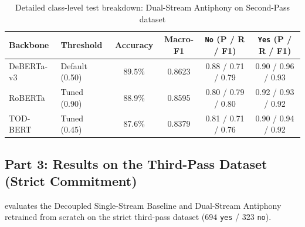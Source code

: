 \begin{table}[htbp]
  \centering
  \small
  \caption{Detailed class-level test breakdown: Dual-Stream Antiphony on Second-Pass dataset}
  \label{tab:breakdown-second-pass}
  \begin{tabularx}{\textwidth}{llcccc}
    \toprule
    \textbf{Backbone} & \textbf{Threshold} & \textbf{Accuracy} & \textbf{Macro-F1} & \textbf{\texttt{No} (P / R / F1)} & \textbf{\texttt{Yes} (P / R / F1)} \\
    \midrule
    DeBERTa-v3 & Default (0.50) & 89.5\% & 0.8623 & 0.88 / 0.71 / 0.79 & 0.90 / 0.96 / 0.93 \\
    \rowcolor{lightbg}
    RoBERTa & Tuned (0.90) & 88.9\% & 0.8595 & 0.80 / 0.79 / 0.80 & 0.92 / 0.93 / 0.92 \\
    TOD-BERT & Tuned (0.45) & 87.6\% & 0.8379 & 0.81 / 0.71 / 0.76 & 0.90 / 0.94 / 0.92 \\
    \bottomrule
  \end{tabularx}
\end{table}

\subsection{Part 3: Results on the Third-Pass Dataset (Strict Commitment)}
 evaluates the Decoupled Single-Stream Baseline and Dual-Stream Antiphony retrained from scratch on the strict third-pass dataset ($694$ \texttt{yes} / $323$ \texttt{no}).

